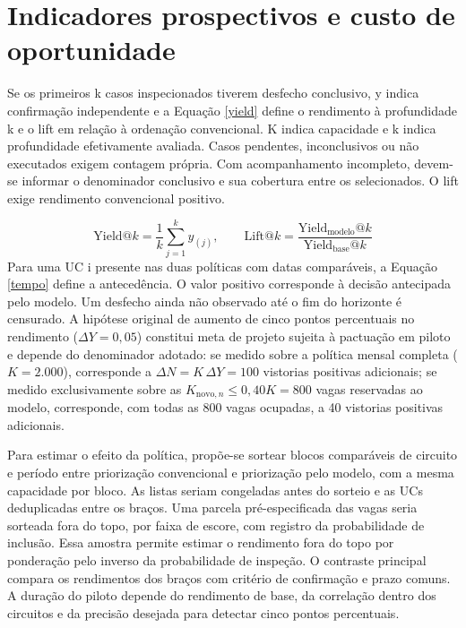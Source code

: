\section{Indicadores prospectivos e custo de oportunidade}
Se os primeiros k casos inspecionados tiverem desfecho conclusivo, y indica confirmação independente e a Equação \eqref{yield} define o rendimento à profundidade k e o lift em relação à ordenação convencional. K indica capacidade e k indica profundidade efetivamente avaliada. Casos pendentes, inconclusivos ou não executados exigem contagem própria. Com acompanhamento incompleto, devem-se informar o denominador conclusivo e sua cobertura entre os selecionados. O lift exige rendimento convencional positivo.

\begin{equation}\label{yield}
\mathrm{Yield}@k=\frac{1}{k}\sum_{j=1}^{k}y_{(j)},\qquad \mathrm{Lift}@k=\frac{\mathrm{Yield}_{\mathrm{modelo}}@k}{\mathrm{Yield}_{\mathrm{base}}@k}
\end{equation}
Para uma UC i presente nas duas políticas com datas comparáveis, a Equação \eqref{tempo} define a antecedência. O valor positivo corresponde à decisão antecipada pelo modelo. Um desfecho ainda não observado até o fim do horizonte é censurado. A hipótese original de aumento de cinco pontos percentuais no rendimento ($\Delta Y = 0{,}05$) constitui meta de projeto sujeita à pactuação em piloto e depende do denominador adotado: se medido sobre a política mensal completa ($K = 2.000$), corresponde a $\Delta N = K\,\Delta Y = 100$ vistorias positivas adicionais; se medido exclusivamente sobre as $K_{\mathrm{novo},n} \le 0{,}40 K = 800$ vagas reservadas ao modelo, corresponde, com todas as 800 vagas ocupadas, a 40 vistorias positivas adicionais.

Para estimar o efeito da política, propõe-se sortear blocos comparáveis de circuito e período entre priorização convencional e priorização pelo modelo, com a mesma capacidade por bloco. As listas seriam congeladas antes do sorteio e as UCs deduplicadas entre os braços. Uma parcela pré-especificada das vagas seria sorteada fora do topo, por faixa de escore, com registro da probabilidade de inclusão. Essa amostra permite estimar o rendimento fora do topo por ponderação pelo inverso da probabilidade de inspeção. O contraste principal compara os rendimentos dos braços com critério de confirmação e prazo comuns. A duração do piloto depende do rendimento de base, da correlação dentro dos circuitos e da precisão desejada para detectar cinco pontos percentuais.

